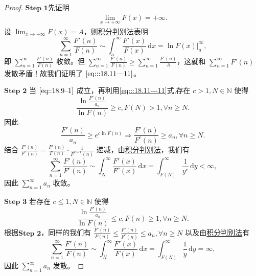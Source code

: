 \documentclass[../../main.tex]{subfiles}
\begin{document}
\begin{proof}
$\mathbf{Step}\,\,\mathbf{1}$先证明
\begin{align}
\lim_{x \to +\infty} F(x) = +\infty. \label{eq:::18.11---11}
\end{align}
设 \(\lim_{x \to +\infty} F(x) = A\)，则\hyperref[theorem:积分判别法]{积分判别法}表明
\[
\sum_{n=1}^\infty \frac{F'(n)}{F(n)} \sim \int_a^\infty \frac{F'(x)}{F(x)} \, \mathrm{d}x = \ln F(x) \big|_a^\infty,
\]
即 \(\sum_{n=1}^\infty \frac{F'(n)}{F(n)}\) 收敛。但 \(\sum_{n=1}^\infty \frac{F'(n)}{F(n)} \geqslant \sum_{n=1}^\infty \frac{F'(n)}{A}\)，这就和 \(\sum_{n=1}^\infty F'(n)\) 发散矛盾！故我们证明了 \(\eqref{eq:::18.11---11}\)。

$\mathbf{Step}\,\,\mathbf{2}$ 当 \(\eqref{eq::18.9--1}\) 成立，再利用\eqref{eq:::18.11---11}式,存在 \( c > 1, N \in \mathbb{N} \) 使得
\[
\frac{\ln \frac{F'(n)}{a_n}}{\ln F(n)} \geqslant c,F(N)>1, \forall n \geqslant N.
\]
因此
\[
\frac{F'(n)}{a_n} \geqslant e^{c \ln F(n)} \Rightarrow \frac{F'(n)}{F^c(n)} \geqslant a_n, \forall n \geqslant N.
\]
结合 \(\frac{F'(n)}{F^c(n)} = \frac{F'(n)}{F(n)} \cdot \frac{1}{F^{c - 1}(n)}\) 递减，由\hyperref[theorem:积分判别法]{积分判别法}，我们有
\[
\sum_{n=1}^\infty \frac{F'(n)}{F^c(n)} \sim \int_N^\infty \frac{F'(x)}{F^c(x)} \, \mathrm{d}x = \int_{F(N)}^\infty \frac{1}{y^c} \, \mathrm{d}y < \infty,
\]
因此 \(\sum_{n=1}^\infty a_n\) 收敛。

$\mathbf{Step}\,\,\mathbf{3}$ 若存在 \( c \leqslant 1, N \in \mathbb{N} \) 使得
\[
\frac{\ln \frac{F'(n)}{a_n}}{\ln F(n)} \leqslant c, F(n) \geqslant 1, \forall n \geqslant N.
\]
根据$\mathbf{Step}\,\,\mathbf{2}$，同样的我们有 \(\frac{F'(n)}{F(n)} \leqslant \frac{F'(n)}{F^c(n)} \leqslant a_n, \forall n \geqslant N\) 以及由\hyperref[theorem:积分判别法]{积分判别法}有
\[
\sum_{n=1}^\infty \frac{F'(n)}{F(n)} \sim \int_N^\infty \frac{F'(x)}{F(x)} \, \mathrm{d}x = \int_{F(N)}^\infty \frac{1}{y} \, \mathrm{d}y = \infty,
\]
因此 \(\sum_{n=1}^\infty a_n\) 发散。
\end{proof}
\end{document}
